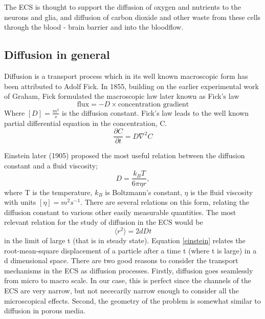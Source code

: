 \documentclass[a4paper,english, 12pt, twoside]{article}
\renewcommand{\d}{\partial}
\begin{document}
The ECS is thought to support the diffusion of oxygen and nutrients to the neurons and glia, and diffusion of carbon dioxide and other waste from these cells through the blood - brain barrier and into the bloodflow. 

\subsection{Diffusion in general}
Diffusion is a transport process which in its well known macroscopic form has been attributed to Adolf Fick. 
In 1855, building on the earlier experimental work of Graham, Fick formulated the macroscopic law later known as Fick's law
\begin{equation}
 \text{flux} = -D\times\text{concentration gradient}
\end{equation}
Where $[D] = \frac{m^2}{s}$ is the diffusion constant. Fick's law leads to the well known partial differential equation in the concentration, C.
\begin{equation}\label{diffusion_eq}
 \frac{\d C}{\d t} = D\nabla^2C
\end{equation}

Einstein later (1905) proposed the most useful relation between the diffusion constant and a fluid viscosity; 
\begin{equation}\label{einstein_viscosity}
D = \frac{k_B T}{6\pi \eta r},
\end{equation}
where T is the temperature, $k_B$ is Boltzmann's constant, $\eta$ is the fluid viscosity with units $[\eta] = m^2s^{-1}$.
There are several relations on this form, relating the diffusion constant to various other easily measurable quantities. 
The most relevant relation for the study of diffusion in the ECS would be
\begin{equation}\label{einstein}
 \langle r^2\rangle = 2dDt
\end{equation}
in the limit of large t (that is in steady state). 
Equation \ref{einstein} relates the root-mean-square displacement of a particle after a time t (where t is large) in a d dimensional space. 
There are two good reasons to consider the transport mechanisms in the ECS as diffusion processes. 
Firstly, diffusion goes seamlessly from micro to macro scale. 
In our case, this is perfect since the channels of the ECS are very narrow, but not nececarily narrow enough to consider all the microscopical effects. 
Second, the geometry of the problem is somewhat similar to diffusion in porous media.\\
\end{document}

